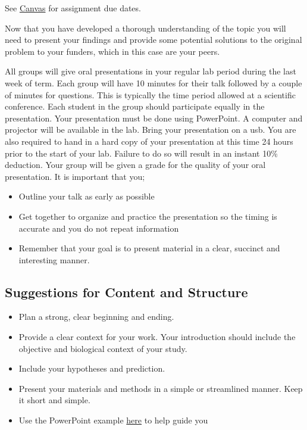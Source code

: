 \documentclass[
]{book}
\providecommand{\tightlist}{%
  \setlength{\itemsep}{0pt}\setlength{\parskip}{0pt}}
\begin{document}
See \href{https://canvas.ubc.ca}{Canvas} for assignment due dates.

Now that you have developed a thorough understanding of the topic you will need to present your findings and provide some potential solutions to the original problem to your funders, which in this case are your peers.

All groups will give oral presentations in your regular lab period during the last week of term. Each group will have 10 minutes for their talk followed by a couple of minutes for questions. This is typically the time period allowed at a scientific conference. Each student in the group should participate equally in the presentation. Your presentation must be done using PowerPoint. A computer and projector will be available in the lab. Bring your presentation on a usb. You are also required to hand in a hard copy of your presentation at this time 24 hours prior to the start of your lab. Failure to do so will result in an instant 10\% deduction. Your group will be given a grade for the quality of your oral presentation. It is important that you;

\begin{itemize}
\tightlist
\item
  Outline your talk as early as possible
\item
  Get together to organize and practice the presentation so the timing is accurate and you do not repeat information
\item
  Remember that your goal is to present material in a clear, succinct and interesting manner.
\end{itemize}

\hypertarget{suggestions-for-content-and-structure}{%
\subsection*{Suggestions for Content and Structure}\label{suggestions-for-content-and-structure}}

\begin{itemize}
\tightlist
\item
  Plan a strong, clear beginning and ending.
\item
  Provide a clear context for your work. Your introduction should include the objective and biological context of your study.
\item
  Include your hypotheses and prediction.
\item
  Present your materials and methods in a simple or streamlined manner. Keep it short and simple.
\item
  Use the PowerPoint example \href{https://osf.io/download/te4x7}{here} to help guide you
\end{itemize}
\end{document}
